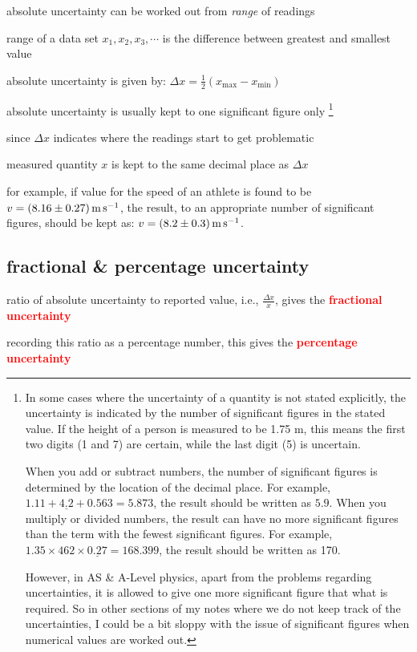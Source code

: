 \documentclass[a4paper,12pt]{book}
\newcounter{example}[chapter]
\newcommand{\cmt}{}
\newcommand{\keypoint}[1]{\textbf{\textcolor{red}{#1}}}
\newcommand{\tmin}{\text{min}}
\newcommand{\tmax}{\text{max}}
\newcommand{\mps}{\,\text{m\,s}^{-1}}
\newcommand{\keypoint}[1]{\textbf{\textcolor{red}{#1}}}
\newcommand{\cmt}{}
\begin{document}
\cmt absolute uncertainty can be worked out from \emph{range} of readings

range of a data set ${x_1, x_2, x_3, \cdots}$ is the difference between greatest and smallest value

absolute uncertainty is given by: $\boxed{\Delta x = \frac{1}{2}\left(x_\tmax-x_\tmin\right)}$

\cmt absolute uncertainty is usually kept to one significant figure only
\footnote{In some cases where the uncertainty of a quantity is not stated explicitly, the uncertainty is indicated by the number of significant figures in the stated value. If the height of a person is measured to be 1.75 m, this means the first two digits (1 and 7) are certain, while the last digit (5) is uncertain.
	
	When you add or subtract numbers, the number of significant figures is determined by the location of the decimal place. For example, $1.11+\underline{4.2}+0.563=5.873$, the result should be written as $5.9$. When you multiply or divided numbers, the result can have no more significant figures than the term with the fewest significant figures. For example, $1.35\times462\times\underline{0.27} = 168.399$, the result should be written as 170.
	
	However, in AS \& A-Level physics, apart from the problems regarding uncertainties, it is allowed to give one more significant figure that what is required. So in other sections of my notes where we do not keep track of the uncertainties, I could be a bit sloppy with the issue of significant figures when numerical values are worked out.}

since $\Delta x$ indicates where the readings start to get problematic

measured quantity $x$ is kept to the same decimal place as $\Delta x$

for example, if value for the speed of an athlete is found to be $v=(8.16\pm0.27)\mps$, the result, to an appropriate number of significant figures, should be kept as: $v=(8.2\pm0.3) \mps$.

\subsection{fractional \& percentage uncertainty}

ratio of absolute uncertainty to reported value, i.e., $\frac{\Delta x}{x}$, gives the \keypoint{fractional uncertainty}

recording this ratio as a percentage number, this gives the \keypoint{percentage uncertainty}
\end{document}
